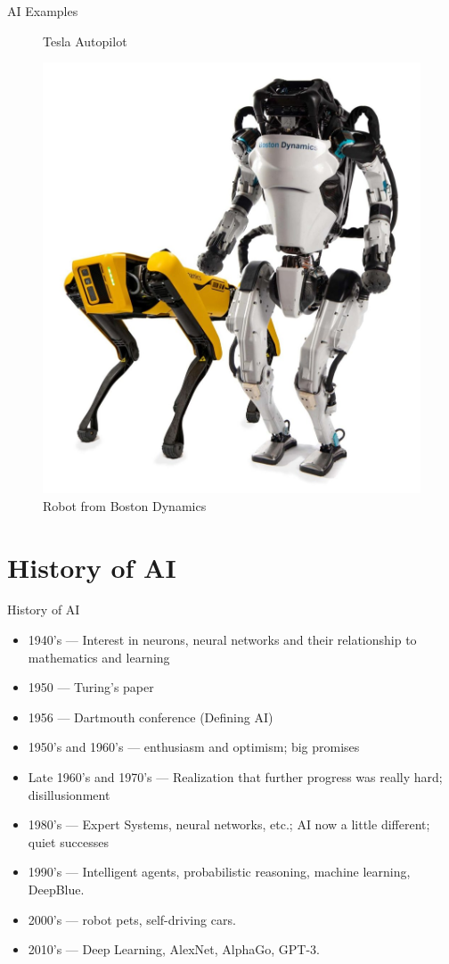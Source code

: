\documentclass{beamer}
\begin{document}
\begin{frame}[allowframebreaks]{AI Examples}
\begin{figure}
\caption{Tesla Autopilot}
\end{figure}
\framebreak
\begin{figure}
\centering
\captionsetup{justification=centering}
\includegraphics[scale=0.60]{BDExample.jpeg}
\caption{Robot from Boston Dynamics}
\end{figure}
\end{frame}

\section{History of AI}
\label{sec:HistoryOfAI}
\begin{frame}[allowframebreaks]{History of AI}

\begin{itemize}
\item 1940’s — Interest in neurons, neural networks and their relationship to mathematics and learning
\item 1950 — Turing’s paper
\item 1956 — Dartmouth conference (Defining AI)
\item 1950’s and 1960’s — enthusiasm and optimism; big promises
\item Late 1960’s and 1970’s — Realization that further progress was really hard; disillusionment
\item 1980’s — Expert Systems, neural networks, etc.; AI now a little different; quiet successes
\item 1990’s — Intelligent agents, probabilistic reasoning, machine learning, DeepBlue.
\item 2000’s — robot pets, self-driving cars.
\item 2010’s — Deep Learning, AlexNet, AlphaGo, GPT-3.
\end{itemize}
\end{frame}
\end{document}
